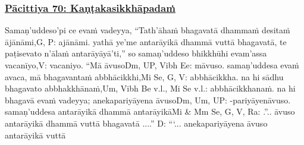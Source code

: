 \subsubsection*{\hyperref[exp70]{Pācittiya 70: Kaṇṭakasikkhāpadaṁ}}
\label{pac70}

Samaṇ'uddeso'pi ce evaṁ vadeyya, ``Tath'āhaṁ bhagavatā dhammaṁ desitaṁ ājānāmi,\makeatletter\hyperlink{endnote-appendix}\makeatother G, P: ajānāmi. yathā ye'me antarāyikā dhammā vuttā bhagavatā, te paṭisevato n'ālaṁ antarāyāyā'ti,'' so samaṇ'uddeso bhikkhūhi evam'assa vacanīyo,\makeatletter\hyperlink{endnote-appendix}\makeatother V: vacaniyo. ``Mā āvuso\makeatletter\hyperlink{endnote-appendix}\makeatother Dm, UP, Vibh Ee: māvuso. samaṇ'uddesa evaṁ avaca, mā bhagavantaṁ abbhācikkhi,\makeatletter\hyperlink{endnote-appendix}\makeatother Mi Se, G, V: abbhācikkha. na hi sādhu bhagavato abbhakkhānaṁ,\makeatletter\hyperlink{endnote-appendix}\makeatother Um, Vibh Be v.l., Mi Se v.l.: abbhācikkhanaṁ. na hi bhagavā evaṁ vadeyya; anekapariyāyena āvuso\makeatletter\hyperlink{endnote-appendix}\makeatother Dm, Um, UP: -pariyāyenāvuso. samaṇ'uddesa antarāyikā dhammā antarāyikā\makeatletter\hyperlink{endnote-appendix}\makeatother Mi & Mm Se, G, V, Ra: .”..  āvuso antarāyikā dhammā vuttā bhagavatā  ....” D: “`...  anekapariyāyena āvuso antarāyikā vuttā
